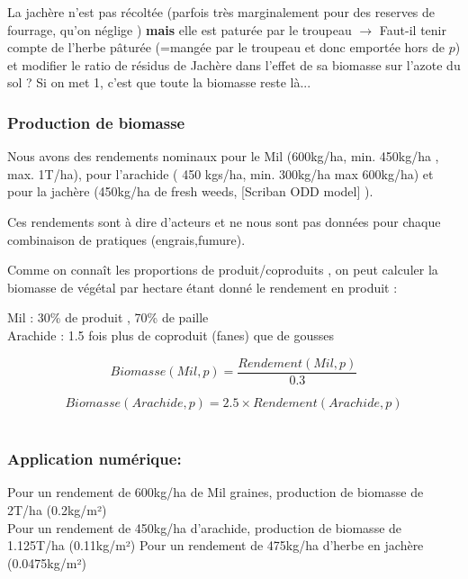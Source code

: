 \documentclass[10pt,a4paper,french]{article} %
\begin{document}
\begin{tcolorbox}[noparskip,
    colback=LightGreen,colframe=DarkGreen,%
    colbacklower=LimeGreen!75!LightGreen,%
    title=Question]

La jachère n'est pas récoltée (parfois très marginalement pour des reserves de fourrage, qu'on néglige ) \textbf{mais} elle est paturée par le troupeau $\rightarrow$ Faut-il  tenir compte de l'herbe pâturée (=mangée par le troupeau et donc emportée hors de $p$) et modifier le ratio de résidus de Jachère dans l'effet de sa biomasse sur l'azote du sol ?  Si on met 1, c'est que toute la biomasse reste là...
\end{tcolorbox}




\subsubsection{Production de biomasse}


Nous avons des rendements nominaux pour le Mil (600kg/ha, min. 450kg/ha , max. 1T/ha), pour l'arachide ( 450 kgs/ha, min. 300kg/ha max 600kg/ha) et pour la jachère (450kg/ha de fresh weeds, [Scriban ODD model] ).

Ces rendements sont à dire d'acteurs et ne nous sont pas données pour chaque combinaison de pratiques (engrais,fumure).

Comme on connaît les proportions de  produit/coproduits , on peut calculer la biomasse de végétal par hectare étant donné le rendement en produit : 

Mil : 30\% de produit ,  70\% de paille \\
Arachide : 1.5 fois plus de coproduit (fanes) que de gousses

\begin{equation}
Biomasse(Mil,p) =  \frac{Rendement(Mil,p)}{0.3}
\end{equation}

\begin{equation}
Biomasse(Arachide,p) =  2.5 \times Rendement(Arachide,p)
\end{equation}\\


\subsubsection{Application numérique:} 

Pour un rendement de 600kg/ha de Mil graines, production de biomasse de 2T/ha (0.2kg/m²)\\
Pour un rendement de 450kg/ha d'arachide, production de biomasse de 1.125T/ha (0.11kg/m²)
Pour un rendement de 475kg/ha d'herbe en jachère (0.0475kg/m²) 
\end{document}
